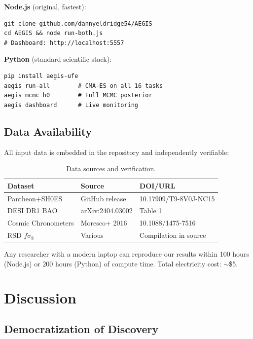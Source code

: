 \documentclass[twocolumn,showpacs,preprintnumbers,amsmath,amssymb,prl]{revtex4-2}
\begin{document}
\textbf{Node.js} (original, fastest):
\begin{verbatim}
git clone github.com/dannyeldridge54/AEGIS
cd AEGIS && node run-both.js
# Dashboard: http://localhost:5557
\end{verbatim}

\textbf{Python} (standard scientific stack):
\begin{verbatim}
pip install aegis-ufe
aegis run-all        # CMA-ES on all 16 tasks
aegis mcmc h0        # Full MCMC posterior
aegis dashboard      # Live monitoring
\end{verbatim}

\subsection{Data Availability}

All input data is embedded in the repository and independently verifiable:

\begin{table}[h]
\caption{Data sources and verification.}
\begin{ruledtabular}
\begin{tabular}{lll}
Dataset & Source & DOI/URL \\
\hline
Pantheon+SH0ES & GitHub release & 10.17909/T9-8V0J-NC15 \\
DESI DR1 BAO & arXiv:2404.03002 & Table 1 \\
Cosmic Chronometers & Moresco+ 2016 & 10.1088/1475-7516 \\
RSD $f\sigma_8$ & Various & Compilation in source \\
\end{tabular}
\end{ruledtabular}
\end{table}

Any researcher with a modern laptop can reproduce our results within 100 hours (Node.js) or 200 hours (Python) of compute time. Total electricity cost: $\sim$\$5.

\section{Discussion}

\subsection{Democratization of Discovery}
\end{document}
